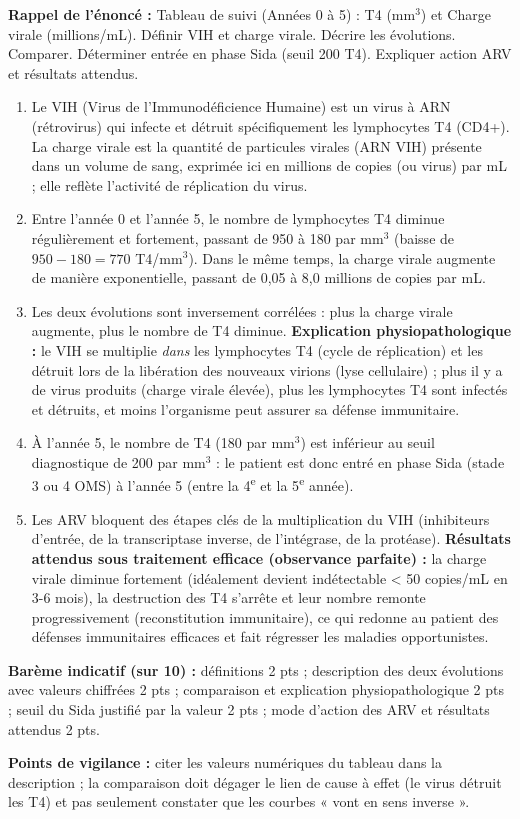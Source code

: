 \documentclass[11pt]{article}
\newcommand{\cle}[1]{{\popxbold\color{popdark}#1}}
\begin{document}
\begin{corrige}
\textbf{Rappel de l'énoncé :} Tableau de suivi (Années 0 à 5) : T4 (mm$^3$) et Charge virale (millions/mL). Définir VIH et charge virale. Décrire les évolutions. Comparer. Déterminer entrée en phase Sida (seuil 200 T4). Expliquer action ARV et résultats attendus.
\tcblower
\begin{enumerate}
\item Le \cle{VIH} (Virus de l'Immunodéficience Humaine) est un virus à ARN (rétrovirus) qui infecte et détruit spécifiquement les lymphocytes T4 (CD4+). La \cle{charge virale} est la quantité de particules virales (ARN VIH) présente dans un volume de sang, exprimée ici en millions de copies (ou virus) par mL ; elle reflète l'activité de réplication du virus.
\item Entre l'année 0 et l'année 5, le nombre de lymphocytes T4 diminue régulièrement et fortement, passant de 950 à 180 par mm$^3$ (baisse de $950 - 180 = 770$ T4/mm$^3$). Dans le même temps, la charge virale augmente de manière exponentielle, passant de 0,05 à 8,0 millions de copies par mL.
\item Les deux évolutions sont inversement corrélées : plus la charge virale augmente, plus le nombre de T4 diminue. \textbf{Explication physiopathologique :} le VIH se multiplie \emph{dans} les lymphocytes T4 (cycle de réplication) et les détruit lors de la libération des nouveaux virions (lyse cellulaire) ; plus il y a de virus produits (charge virale élevée), plus les lymphocytes T4 sont infectés et détruits, et moins l'organisme peut assurer sa défense immunitaire.
\item À l'année 5, le nombre de T4 (180 par mm$^3$) est inférieur au seuil diagnostique de 200 par mm$^3$ : le patient est donc entré en phase Sida (stade 3 ou 4 OMS) à l'année 5 (entre la 4\textsuperscript{e} et la 5\textsuperscript{e} année).
\item Les ARV bloquent des étapes clés de la multiplication du VIH (inhibiteurs d'entrée, de la transcriptase inverse, de l'intégrase, de la protéase). \textbf{Résultats attendus sous traitement efficace (observance parfaite) :} la charge virale diminue fortement (idéalement devient indétectable < 50 copies/mL en 3-6 mois), la destruction des T4 s'arrête et leur nombre remonte progressivement (reconstitution immunitaire), ce qui redonne au patient des défenses immunitaires efficaces et fait régresser les maladies opportunistes.
\end{enumerate}
\textbf{Barème indicatif (sur 10) :} définitions 2 pts ; description des deux évolutions avec valeurs chiffrées 2 pts ; comparaison et explication physiopathologique 2 pts ; seuil du Sida justifié par la valeur 2 pts ; mode d'action des ARV et résultats attendus 2 pts.

\textbf{Points de vigilance :} citer les valeurs numériques du tableau dans la description ; la comparaison doit dégager le lien de cause à effet (le virus détruit les T4) et pas seulement constater que les courbes « vont en sens inverse ».
\end{corrige}
\end{document}
